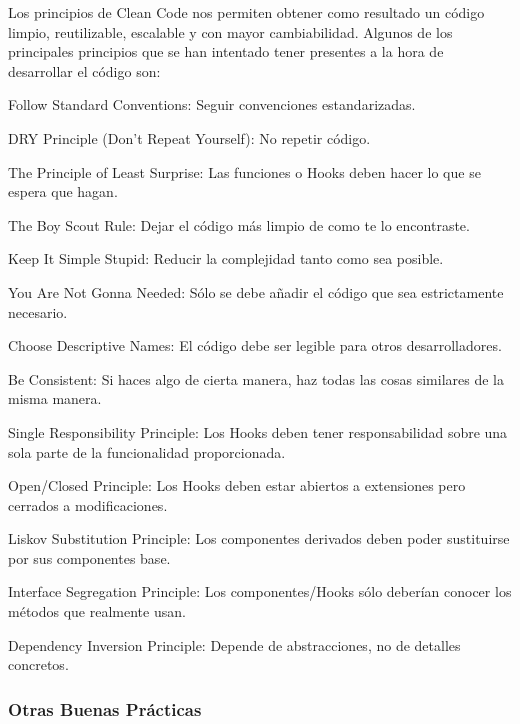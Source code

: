 \documentclass[12pt,twoside,titlepage]{report}
\begin{document}
Los principios de Clean Code nos permiten obtener como resultado un código limpio, reutilizable, escalable y con mayor cambiabilidad. Algunos de los principales principios que se han intentado tener presentes a la hora de desarrollar el código son:

\begin{compactitem}
    \item Follow Standard Conventions: Seguir convenciones estandarizadas.
    \item DRY Principle (Don't Repeat Yourself): No repetir código.
    \item The Principle of Least Surprise: Las funciones o Hooks deben hacer lo que se espera que hagan.
    \item The Boy Scout Rule: Dejar el código más limpio de como te lo encontraste.
    \item Keep It Simple Stupid: Reducir la complejidad tanto como sea posible.
    \item You Are Not Gonna Needed: Sólo se debe añadir el código que sea estrictamente necesario.
    \item Choose Descriptive Names: El código debe ser legible para otros desarrolladores.
    \item Be Consistent: Si haces algo de cierta manera, haz todas las cosas similares de la misma manera.
    \item Single Responsibility Principle: Los Hooks deben tener responsabilidad sobre una sola parte de la funcionalidad proporcionada.
    \item Open/Closed Principle: Los Hooks deben estar abiertos a extensiones pero cerrados a modificaciones.
    \item Liskov Substitution Principle: Los componentes derivados deben poder sustituirse por sus componentes base.
    \item Interface Segregation Principle: Los componentes/Hooks sólo deberían conocer los métodos que realmente usan.
    \item Dependency Inversion Principle: Depende de abstracciones, no de detalles concretos.
\end{compactitem}

\subsubsection{Otras Buenas Prácticas}
\end{document}

